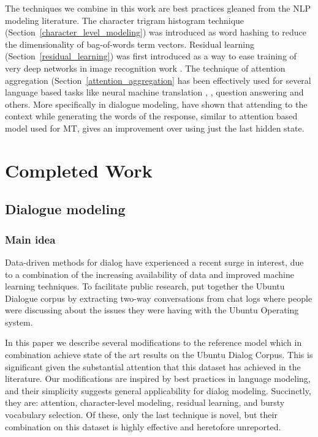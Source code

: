 \documentclass[11pt]{article}
\begin{document}
The techniques we combine in this work are best practices gleaned from the NLP modeling literature. 
The character trigram histogram technique (Section~\ref{character_level_modeling}) was introduced as word hashing \cite{DBLP:conf/cikm/HuangHGDAH13} to reduce the dimensionality of bag-of-words term vectors. Residual learning (Section~\ref{residual_learning}) was first introduced as a way to ease training of very deep networks in image recognition work \cite{he2015deep}. The technique of attention aggregation (Section~\ref{attention_aggregation} has been effectively used for several language based tasks like neural machine translation \cite{DBLP:journals/corr/BahdanauCB14}, \cite{DBLP:conf/emnlp/LuongPM15}, question answering \cite{} and others. More specifically in dialogue modeling, \cite{DBLP:journals/corr/YaoPZW16} have shown that attending to the context while generating the words of the response, similar to attention based model used for MT, gives an improvement over using just the last hidden state.

\section{Completed Work}

\subsection{Dialogue modeling}

\subsubsection{Main idea}

Data-driven methods for dialog have experienced a recent surge in
interest, due to a combination of the increasing availability of data and
improved machine learning techniques.  To facilitate public research,
\cite{DBLP:conf/sigdial/LowePSP15} put together the Ubuntu Dialogue
corpus by extracting two-way conversations from chat logs where people
were discussing about the issues they were having with the Ubuntu
Operating system.  

In this paper we describe several modifications to the reference model
which in combination achieve state of the art results on the Ubuntu
Dialog Corpus.  This is significant given the substantial attention that
this dataset has achieved in the literature.  Our modifications are
inspired by best practices in language modeling, and their simplicity
suggests general applicability for dialog modeling.  Succinctly, they
are: attention, character-level modeling, residual learning, and bursty
vocabulary selection.  Of these, only the last technique is novel, but
their combination on this dataset is highly effective and heretofore
unreported.
\end{document}

